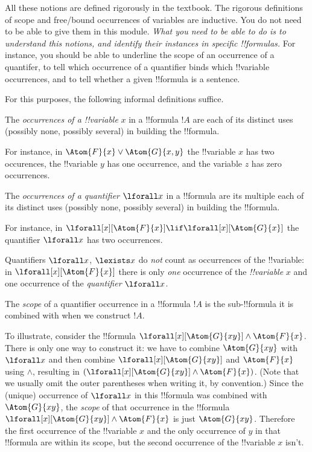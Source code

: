 \documentclass[../../../../include/open-logic-section]{subfiles}
\begin{document}
All these notions are defined rigorously in the textbook. The 
rigorous definitions of scope and free/bound occurrences of variables
are inductive. You do not need to be able to give them in this module.
\emph{What you need to be able to do is to understand this notions, 
and identify their instances in specific !!{formula}s.} For instance,
you should be able to underline the scope of an occurrence of a 
quantifer, to tell which occurrence of a quantifier binds which 
!!{variable} occurrences, and to tell whether a given !!{formula}
is a sentence. 

For this purposes, the following informal definitions suffice. 

\begin{defn}
The \emph{occurrences of a !!{variable}} $x$ in a !!{formula} $!A$ 
are each of its distinct uses (possibly none, possibly several) 
in building the !!{formula}.
\end{defn}

For instance, in $\Atom{F}{x}\lor\Atom{G}{x,y}$ the !!{variable} $x$ has
two occurences, the !!{variable} $y$ has one occurrence, and the variable
$z$ has zero occurrences. 

\begin{defn}
The \emph{occurrences of a quantifier} $\lforall x$ in a !!{formula}
are its multiple each of its distinct uses (possibly none, possibly several) 
in building the !!{formula}. 
\end{defn}

For instance, in 
$\lforall[x][\Atom{F}{x}]\lif\lforall[x][\Atom{G}{x}]$ 
the quantifier $\lforall x$ has two occurrences.

Quantifiers $\lforall x$, 
$\lexists x$ do \emph{not} count as occurrences of the !!{variable}: 
in $\lforall[x][\Atom{F}{x}]$ there is only \emph{one} occurrence of the 
\emph{!!{variable}} $x$ and one occurrence of the \emph{quantifier} 
$\lforall x$.

\begin{defn}
The \emph{scope} of a quantifier occurrence in a !!{formula} $!A$ is
the sub-!!{formula} it is combined with when we construct $!A$. 
\end{defn}

To illustrate, consider the !!{formula}
 $\lforall[x][\Atom{G}{xy}]\land\Atom{F}{x}$. There is only one way to
 construct it: we have to combine $\Atom{G}{xy}$ with $\lforall x$ and
 then combine $\lforall[x][\Atom{G}{xy}]$ and $\Atom{F}{x}$ using
 $\land$, resulting in $(\lforall[x][\Atom{G}{xy}]\land\Atom{F}{x})$.
 (Note that we usually omit the outer parentheses when writing it, by
 convention.) Since the (unique) occurrence of $\lforall x$ in this
 !!{formula} was combined with $\Atom{G}{xy}$, the \emph{scope} of
 that occurrence in the !!{formula}
 $\lforall[x][\Atom{G}{xy}]\land\Atom{F}{x}$ is just $\Atom{G}{xy}$.
 Therefore the first occurrence of the !!{variable} $x$ and the only
 occurrence of $y$ in that !!{formula} are within its scope, but the
 second occurrence of the !!{variable} $x$ isn't.
\end{document}
